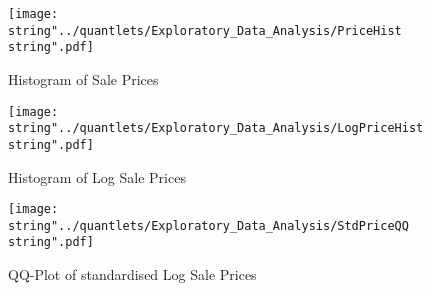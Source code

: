 \begin{figure}[H]
  \centering
\texttt{[image: \\string"../quantlets/Exploratory\_Data\_Analysis/PriceHist\\string".pdf]}
  \caption{Histogram of Sale Prices}\label{fig:pricehist}
\end{figure}

\begin{figure}[H]
  \centering
\texttt{[image: \\string"../quantlets/Exploratory\_Data\_Analysis/LogPriceHist\\string".pdf]}
  \caption{Histogram of Log Sale Prices}\label{fig:logpricehist}
\end{figure}

\begin{figure}[H]
  \centering
\texttt{[image: \\string"../quantlets/Exploratory\_Data\_Analysis/StdPriceQQ\\string".pdf]}
  \caption{QQ-Plot of standardised Log Sale Prices}\label{fig:stdpriceqq}
\end{figure}




